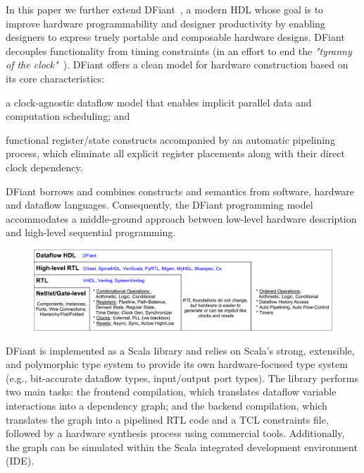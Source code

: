 In this paper we further extend DFiant~\cite{Port2017}, a modern HDL whose goal is to improve hardware programmability and designer productivity by enabling designers to express truely portable and composable hardware designs.
DFiant decouples functionality from timing constraints (in an effort to end the \emph{"tyranny of the clock"}~\cite{Sutherland2012}). DFiant offers a clean model for hardware construction based on its core characteristics:
\begin{enumerate*}[label=(\roman*)]
\item
  a clock-agnostic dataflow model that enables implicit parallel data and computation scheduling; and
\item
  functional register/state constructs accompanied by an automatic pipelining process, which eliminate all explicit register placements along with their direct clock dependency.
\end{enumerate*} DFiant borrows and combines constructs and semantics from software, hardware and dataflow languages. Consequently, the DFiant programming model accommodates a middle-ground approach between low-level hardware description and high-level sequential programming. 

\begin{figure}[t]
	\centering
	\includegraphics[width=\linewidth]{graphics/motivation.pdf} 
	\label{fig:motivation}
\end{figure}

DFiant is implemented as a Scala library and relies on Scala's strong, extensible, and polymorphic type system to provide its own hardware-focused type system (e.g., bit-accurate dataflow types, input/output port types). The library performs two main tasks: the frontend compilation, which translates dataflow variable interactions into a dependency graph; and the backend compilation, which translates the graph into a pipelined RTL code and a TCL constraints file, followed by a hardware synthesis process using commercial tools. Additionally, the graph can be simulated within the Scala integrated development environment (IDE). 

